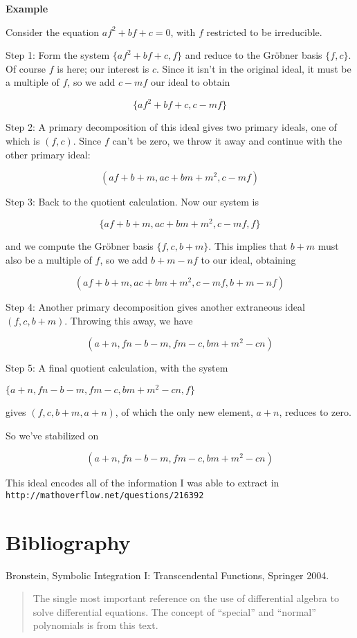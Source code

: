 \documentclass{article}
\begin{document}
{\bf Example}

Consider the equation $af^2+bf+c=0$, with $f$ restricted to be irreducible.

Step 1: Form the system $\{af^2+bf+c, f\}$ and reduce to the Gr\"obner
basis $\{f,c\}$.  Of course $f$ is here; our interest is $c$.  Since
it isn't in the original ideal, it must be a multiple of $f$, so we
add $c-mf$ our ideal to obtain

$$\{af^2+bf+c, c-mf\}$$

Step 2: A primary decomposition of this ideal gives two primary
ideals, one of which is $(f,c)$.  Since $f$ can't be zero, we throw it
away and continue with the other primary ideal:

$$(af+b+m, ac+bm+m^2, c-mf)$$

Step 3: Back to the quotient calculation.  Now our system is

$$\{af+b+m, ac+bm+m^2, c-mf, f\}$$

and we compute the Gr\"obner basis $\{f, c, b+m\}$.  This implies that
$b+m$ must also be a multiple of $f$, so we add $b+m-nf$ to our ideal,
obtaining

$$(af+b+m, ac+bm+m^2, c-mf, b+m-nf)$$

Step 4: Another primary decomposition gives another extraneous ideal
$(f,c,b+m)$.  Throwing this away, we have

$$(a+n, fn-b-m, fm-c, bm+m^2-cn)$$

Step 5: A final quotient calculation, with the system

$\{a+n, fn-b-m, fm-c, bm+m^2-cn, f\}$

gives $(f,c,b+m,a+n)$, of which the only new element, $a+n$, reduces
to zero.

So we've stabilized on 

$$(a+n, fn-b-m, fm-c, bm+m^2-cn)$$

This ideal encodes all of the information I was able to extract in
{\tt http://mathoverflow.net/questions/216392}

\vfill\eject

\section*{Bibliography}

Bronstein, Symbolic Integration I: Transcendental Functions, Springer 2004.

\begin{quote}
The single most important reference on the use of differential
algebra to solve differential equations.  The concept of
``special'' and ``normal'' polynomials is from this text.
\end{quote}
\end{document}
